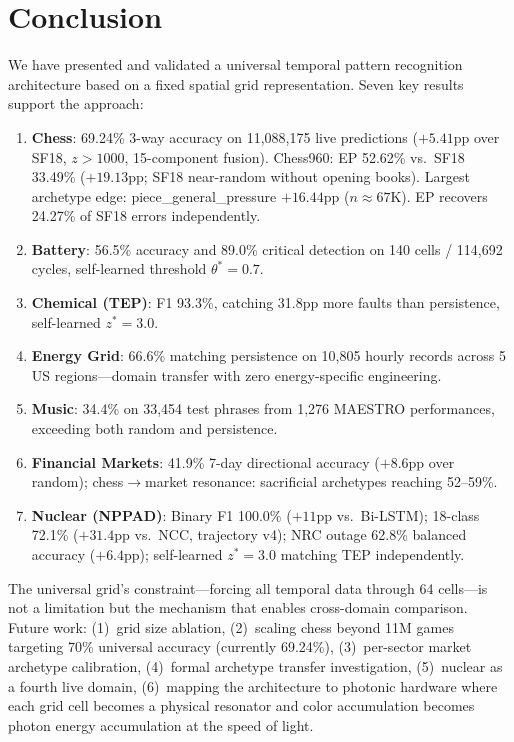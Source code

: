 \documentclass[12pt,a4paper]{article}
\begin{document}
\section{Conclusion}

We have presented and validated a universal temporal pattern recognition architecture based on a
fixed spatial grid representation. Seven key results support the approach:

\begin{enumerate}
  \item \textbf{Chess}: 69.24\% 3-way accuracy on 11,088,175 live predictions ($+5.41$pp over
  SF18, $z{>}1000$, 15-component fusion). Chess960: EP 52.62\% vs.\ SF18 33.49\% ($+19.13$pp;
  SF18 near-random without opening books). Largest archetype edge: piece\_general\_pressure
  $+16.44$pp ($n{\approx}67$K). EP recovers 24.27\% of SF18 errors independently.

  \item \textbf{Battery}: 56.5\% accuracy and 89.0\% critical detection on 140 cells / 114,692
  cycles, self-learned threshold $\theta^*{=}0.7$.

  \item \textbf{Chemical (TEP)}: F1 93.3\%, catching 31.8pp more faults than persistence,
  self-learned $z^*{=}3.0$.

  \item \textbf{Energy Grid}: 66.6\% matching persistence on 10,805 hourly records across 5 US
  regions---domain transfer with zero energy-specific engineering.

  \item \textbf{Music}: 34.4\% on 33,454 test phrases from 1,276 MAESTRO performances, exceeding
  both random and persistence.

  \item \textbf{Financial Markets}: 41.9\% 7-day directional accuracy ($+8.6$pp over random);
  chess$\rightarrow$market resonance: sacrificial archetypes reaching 52--59\%.

  \item \textbf{Nuclear (NPPAD)}: Binary F1 100.0\% ($+11$pp vs.\ Bi-LSTM); 18-class 72.1\%
  ($+31.4$pp vs.\ NCC, trajectory v4); NRC outage 62.8\% balanced accuracy ($+6.4$pp);
  self-learned $z^*{=}3.0$ matching TEP independently.
\end{enumerate}

The universal grid's constraint---forcing all temporal data through 64 cells---is not a limitation
but the mechanism that enables cross-domain comparison. Future work: (1)~grid size ablation,
(2)~scaling chess beyond 11M games targeting 70\% universal accuracy (currently 69.24\%), (3)~per-sector market archetype
calibration, (4)~formal archetype transfer investigation, (5)~nuclear as a fourth live domain,
(6)~mapping the architecture to photonic hardware where each grid cell becomes a physical resonator
and color accumulation becomes photon energy accumulation at the speed of light.
\end{document}
